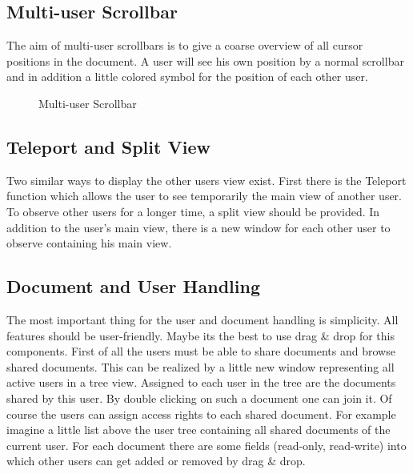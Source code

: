 \documentclass[11pt,a4paper]{article}
\begin{document}
\subsection{Multi-user Scrollbar}
The aim of multi-user scrollbars is to give a coarse overview of all cursor positions in the document. A user will see his own position by a normal scrollbar and in addition a little colored symbol for the position of each other user.
\begin{figure}[H]
\centering
{}
\caption{Multi-user Scrollbar}
\end{figure}

\subsection{Teleport and Split View}
Two similar ways to display the other users view exist. First there is the Teleport function which allows the user to see temporarily the main view of another user. To observe other users for a longer time, a split view should be provided. In addition to the user's main view, there is a new window for each other user to observe containing his main view.

\subsection{Document and User Handling}
The most important thing for the user and document handling is simplicity. All features should be user-friendly. Maybe its the best to use drag \& drop for this components. First of all the users must be able to share documents and browse shared documents. This can be realized by a little new window representing all active users in a tree view. Assigned to each user in the tree are the documents shared by this user. By double clicking on such a document one can join it. Of course the users can assign access rights to each shared document. For example imagine a little list above the user tree containing all shared documents of the current user. For each document there are some fields (read-only, read-write) into which other users can get added or removed by drag \& drop.
\end{document}

